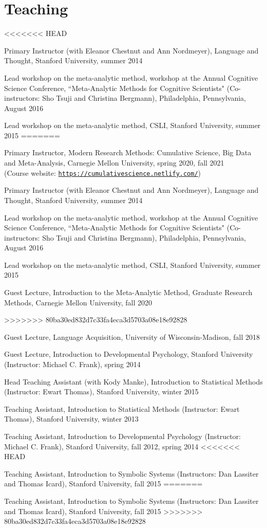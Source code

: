 \documentclass[letterpaper]{article}
\renewenvironment{itemize}{
  \begin{list}{}{
    \setlength{\leftmargin}{1.5em}
  }
}{
  \end{list}
}
\begin{document}
\section*{Teaching}
\begin{itemize}
<<<<<<< HEAD
\item  Primary Instructor (with Eleanor Chestnut and Ann Nordmeyer), Language and Thought, Stanford University, summer 2014
\item Lead workshop on the meta-analytic method, workshop at the Annual Cognitive Science Conference, ``Meta-Analytic Methods for Cognitive Scientists" (Co-instructors: Sho Tsuji and Christina Bergmann), Philadelphia, Pennsylvania, August 2016
\item  Lead workshop on the meta-analytic method, CSLI, Stanford University, summer 2015
=======
\item Primary Instructor, Modern Research Methods: Cumulative Science, Big Data and Meta-Analysis, Carnegie Mellon University, spring 2020, fall 2021 \\(Course website: \href{https://cumulativescience.netlify.com/}{\tt https://cumulativescience.netlify.com/})
\item  Primary Instructor (with Eleanor Chestnut and Ann Nordmeyer), Language and Thought, Stanford University, summer 2014
\item Lead workshop on the meta-analytic method, workshop at the Annual Cognitive Science Conference, ``Meta-Analytic Methods for Cognitive Scientists" (Co-instructors: Sho Tsuji and Christina Bergmann), Philadelphia, Pennsylvania, August 2016
\item  Lead workshop on the meta-analytic method, CSLI, Stanford University, summer 2015
\item  Guest Lecture, Introduction to the Meta-Analytic Method, Graduate Research Methods, Carnegie Mellon University, fall 2020

>>>>>>> 80ba30ed832d7c33fa4eca3d5703a08e18e92828
\item  Guest Lecture, Language Acquisition, University of Wisconsin-Madison, fall 2018
\item Guest Lecture, Introduction to Developmental Psychology, Stanford University (Instructor: Michael C. Frank), spring 2014
\item Head Teaching Assistant (with Kody Manke), Introduction to Statistical Methods (Instructor: Ewart Thomas), Stanford University, winter 2015

\item  Teaching Assistant,  Introduction to Statistical Methods (Instructor: Ewart Thomas), Stanford University, winter 2013
\item Teaching Assistant, Introduction to Developmental Psychology (Instructor: Michael C. Frank), Stanford University, fall 2012, spring 2014
<<<<<<< HEAD
\item Teaching Assistant, Introduction to Symbolic Systems (Instructors: Dan Lassiter and Thomas Icard), Stanford University, fall 2015 
=======
\item Teaching Assistant, Introduction to Symbolic Systems (Instructors: Dan Lassiter and Thomas Icard), Stanford University, fall 2015
>>>>>>> 80ba30ed832d7c33fa4eca3d5703a08e18e92828



\end{itemize}
\end{document}
